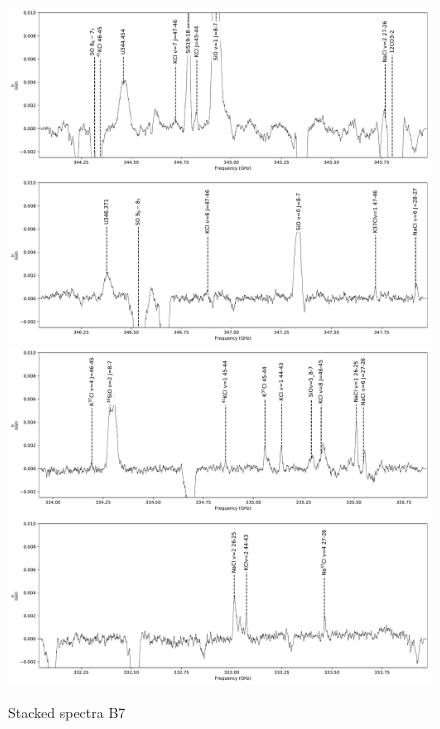\documentclass[twocolumn]{aastex62}
\begin{document}
\begin{figure}[!htp]
\includegraphics[scale=1,width=5.5in]{figures/lines_labeled_OrionSourceI_B7.lb_spw0_robust0.5.pdf}
\includegraphics[scale=1,width=5.5in]{figures/lines_labeled_OrionSourceI_B7.lb_spw1_robust0.5.pdf}
\includegraphics[scale=1,width=5.5in]{figures/lines_labeled_OrionSourceI_B7.lb_spw2_robust0.5.pdf}
\includegraphics[scale=1,width=5.5in]{figures/lines_labeled_OrionSourceI_B7.lb_spw3_robust0.5.pdf}
\caption{Stacked spectra B7}
\label{fig:spectrab7}
\end{figure}
\end{document}
